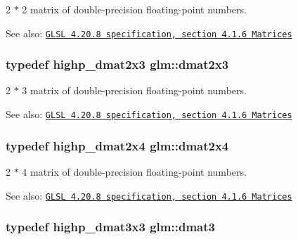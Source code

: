 2 $\ast$ 2 matrix of double-precision floating-point numbers.

\begin{Desc}
\item[See also:]\href{http://www.opengl.org/registry/doc/GLSLangSpec.4.20.8.pdf}{\tt GLSL 4.20.8 specification, section 4.1.6 Matrices} \end{Desc}
\hypertarget{group__core__types_g6b5ff9888ca0e468f35b637d4c3a361d}{
\subsubsection[dmat2x3]{\setlength{\rightskip}{0pt plus 5cm}typedef highp\_\-dmat2x3 {\bf glm::dmat2x3}}}
\label{group__core__types_g6b5ff9888ca0e468f35b637d4c3a361d}


2 $\ast$ 3 matrix of double-precision floating-point numbers.

\begin{Desc}
\item[See also:]\href{http://www.opengl.org/registry/doc/GLSLangSpec.4.20.8.pdf}{\tt GLSL 4.20.8 specification, section 4.1.6 Matrices} \end{Desc}
\hypertarget{group__core__types_g2d1dd4b4925d1ea67539902c820483a0}{
\subsubsection[dmat2x4]{\setlength{\rightskip}{0pt plus 5cm}typedef highp\_\-dmat2x4 {\bf glm::dmat2x4}}}
\label{group__core__types_g2d1dd4b4925d1ea67539902c820483a0}


2 $\ast$ 4 matrix of double-precision floating-point numbers.

\begin{Desc}
\item[See also:]\href{http://www.opengl.org/registry/doc/GLSLangSpec.4.20.8.pdf}{\tt GLSL 4.20.8 specification, section 4.1.6 Matrices} \end{Desc}
\hypertarget{group__core__types_g25fd62195c3ef5ac0d32ead1dbfbb929}{
\subsubsection[dmat3]{\setlength{\rightskip}{0pt plus 5cm}typedef highp\_\-dmat3x3 {\bf glm::dmat3}}}
\label{group__core__types_g25fd62195c3ef5ac0d32ead1dbfbb929}


